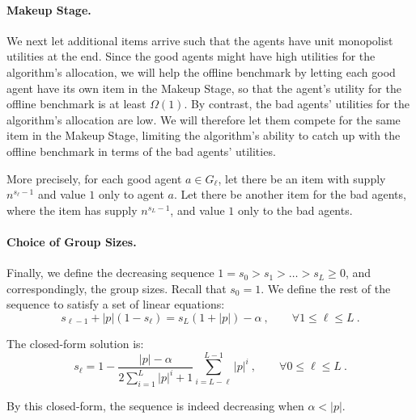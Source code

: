 \documentclass[11pt,letterpaper]{article}
\begin{document}
\paragraph{Makeup Stage.}
We next let additional items arrive such that the agents have unit monopolist utilities at the end.
Since the good agents might have high utilities for the algorithm's allocation, we will help the offline benchmark by letting each good agent have its own item in the Makeup Stage, so that the agent's utility for the offline benchmark is at least $\Omega(1)$.
By contrast, the bad agents' utilities for the algorithm's allocation are low.
We will therefore let them compete for the same item in the Makeup Stage, limiting the algorithm's ability to catch up with the offline benchmark in terms of the bad agents' utilities. 

More precisely, for each good agent $a \in G_\ell$, let there be an item with supply $n^{s_\ell-1}$ and value $1$ only to agent $a$.
Let there be another item for the bad agents, where the item has supply $n^{s_L-1}$, and value $1$ only to the bad agents.

\paragraph{Choice of Group Sizes.}
Finally, we define the decreasing sequence $1 = s_0 > s_1 > \dots > s_L \ge 0$, and correspondingly, the group sizes.
Recall that $s_0 = 1$.
We define the rest of the sequence to satisfy a set of linear equations:
\begin{equation}
	\label{eq:lower-bound-neg-recurrence}
	s_{\ell-1} + |p| (1-s_\ell) = s_L(1+|p|) - \alpha
	~,
	\qquad \forall 1 \le \ell \le L~.
\end{equation}

The closed-form solution is:
\begin{equation}
	\label{eq:lower-bound-neg-closed-form}
	s_\ell = 1 - \frac{|p|-\alpha}{2\sum_{i=1}^L |p|^i +1} \sum_{i=L-\ell}^{L-1} |p|^i
	~,
	\qquad 
	\forall 0 \le \ell \le L
	~.
\end{equation}


By this closed-form, the sequence is indeed decreasing when $\alpha<|p|$.









 
\end{document}
